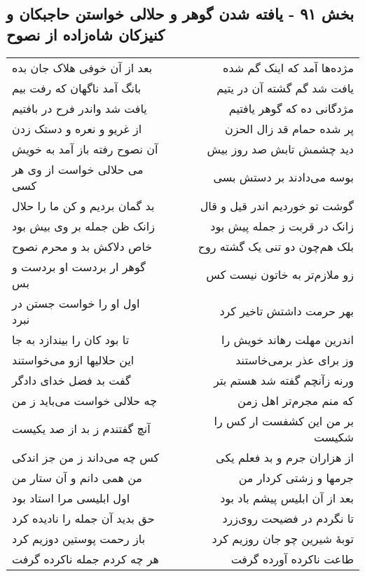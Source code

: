 \begin{center}
\section*{بخش ۹۱ - یافته شدن گوهر و حلالی خواستن حاجبکان و کنیزکان شاه‌زاده از نصوح}
\label{sec:sh091}
\begin{longtable}{l p{0.5cm} r}
بعد از آن خوفی هلاک جان بده
&&
مژده‌ها آمد که اینک گم شده
\\
بانگ آمد ناگهان که رفت بیم
&&
یافت شد گم گشته آن در یتیم
\\
یافت شد واندر فرح در بافتیم
&&
مژدگانی ده که گوهر یافتیم
\\
از غریو و نعره و دستک زدن
&&
پر شده حمام قد زال الحزن
\\
آن نصوح رفته باز آمد به خویش
&&
دید چشمش تابش صد روز بیش
\\
می حلالی خواست از وی هر کسی
&&
بوسه می‌دادند بر دستش بسی
\\
بد گمان بردیم و کن ما را حلال
&&
گوشت تو خوردیم اندر قیل و قال
\\
زانک ظن جمله بر وی بیش بود
&&
زانک در قربت ز جمله پیش بود
\\
خاص دلاکش بد و محرم نصوح
&&
بلک هم‌چون دو تنی یک گشته روح
\\
گوهر ار بردست او بردست و بس
&&
زو ملازم‌تر به خاتون نیست کس
\\
اول او را خواست جستن در نبرد
&&
بهر حرمت داشتش تاخیر کرد
\\
تا بود کان را بیندازد به جا
&&
اندرین مهلت رهاند خویش را
\\
این حلالیها ازو می‌خواستند
&&
وز برای عذر برمی‌خاستند
\\
گفت بد فضل خدای دادگر
&&
ورنه زآنچم گفته شد هستم بتر
\\
چه حلالی خواست می‌باید ز من
&&
که منم مجرم‌تر اهل زمن
\\
آنچ گفتندم ز بد از صد یکیست
&&
بر من این کشفست ار کس را شکیست
\\
کس چه می‌داند ز من جز اندکی
&&
از هزاران جرم و بد فعلم یکی
\\
من همی دانم و آن ستار من
&&
جرمها و زشتی کردار من
\\
اول ابلیسی مرا استاد بود
&&
بعد از آن ابلیس پیشم باد بود
\\
حق بدید آن جمله را نادیده کرد
&&
تا نگردم در فضیحت روی‌زرد
\\
باز رحمت پوستین دوزیم کرد
&&
توبهٔ شیرین چو جان روزیم کرد
\\
هر چه کردم جمله ناکرده گرفت
&&
طاعت ناکرده آورده گرفت
\\

\end{longtable}
\end{center}
